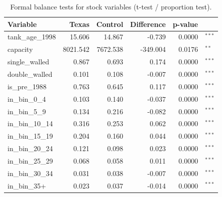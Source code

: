 \begin{table}[!h]
\centering
\caption{\label{tab:tab:stock-balance-tests}Formal balance tests for stock variables (t-test / proportion test).}
\centering
\fontsize{10}{12}\selectfont
\begin{tabular}[t]{lrrrrl}
\toprule
Variable & Texas & Control & Difference & p-value & \\
\midrule
tank_age_1998 & 15.606 & 14.867 & -0.739 & 0.0000 & $^{***}$\\
capacity & 8021.542 & 7672.538 & -349.004 & 0.0176 & $^{**}$\\
single_walled & 0.867 & 0.693 & 0.174 & 0.0000 & $^{***}$\\
double_walled & 0.101 & 0.108 & -0.007 & 0.0000 & $^{***}$\\
is_pre_1988 & 0.763 & 0.645 & 0.117 & 0.0000 & $^{***}$\\
in_bin_0_4 & 0.103 & 0.140 & -0.037 & 0.0000 & $^{***}$\\
in_bin_5_9 & 0.134 & 0.216 & -0.082 & 0.0000 & $^{***}$\\
in_bin_10_14 & 0.316 & 0.253 & 0.062 & 0.0000 & $^{***}$\\
in_bin_15_19 & 0.204 & 0.160 & 0.044 & 0.0000 & $^{***}$\\
in_bin_20_24 & 0.121 & 0.098 & 0.023 & 0.0000 & $^{***}$\\
in_bin_25_29 & 0.068 & 0.058 & 0.011 & 0.0000 & $^{***}$\\
in_bin_30_34 & 0.031 & 0.038 & -0.007 & 0.0000 & $^{***}$\\
in_bin_35+ & 0.023 & 0.037 & -0.014 & 0.0000 & $^{***}$\\
\bottomrule
\end{tabular}
\end{table}

